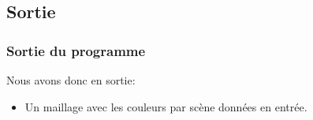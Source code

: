	 \subsection{Sortie}
	 \begin{frame}
	  \frametitle{Sortie du programme}
	   Nous avons donc en sortie:
	  \begin{itemize}
	    [triangle]
	    \item Un maillage avec les couleurs par scène données en entrée.
	    
	    
	    \end{itemize}
	 \end{frame}
